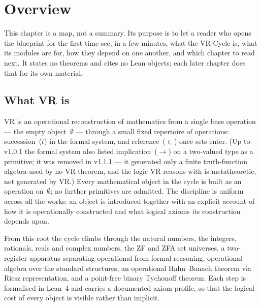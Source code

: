 \chapter{Overview}
\label{chap:overview}

This chapter is a map, not a summary.  Its purpose is to let a reader who
opens the blueprint for the first time see, in a few minutes, what the VR
Cycle is, what its modules are for, how they depend on one another,
and which chapter to read next.  It states no theorems and cites no Lean
objects; each later chapter does that for its own material.

\section{What VR is}
\label{sec:overview_what}

VR is an operational reconstruction of mathematics from a single
base operation --- the empty object~$\emptyset$ --- through a small
fixed repertoire of operations: succession~($t$) in the formal system, and
reference~($\in$) once sets enter.  (Up to v1.0.1 the formal system also
listed implication~($\to$) on a two-valued type as a primitive; it was
removed in v1.1.1 --- it generated only a finite truth-function algebra used
by no VR theorem, and the logic VR reasons with is metatheoretic, not
generated by VR.)  Every
mathematical object in the cycle is built as an operation on~$\emptyset$;
no further primitives are admitted.  The discipline is uniform across all
the works: an object is introduced together with an explicit account of
how it is operationally constructed and what logical axioms its
construction depends upon.

From this root the cycle climbs through the natural numbers, the integers,
rationals, reals and complex numbers, the ZF and ZFA set universes, a
two-register apparatus separating operational from formal reasoning,
operational algebra over the standard structures, an operational
Hahn--Banach theorem via Riesz representation, and a point-free binary
Tychonoff theorem.  Each step is formalised in Lean~4 and carries a
documented axiom profile, so that the logical cost of every object is
visible rather than implicit.

